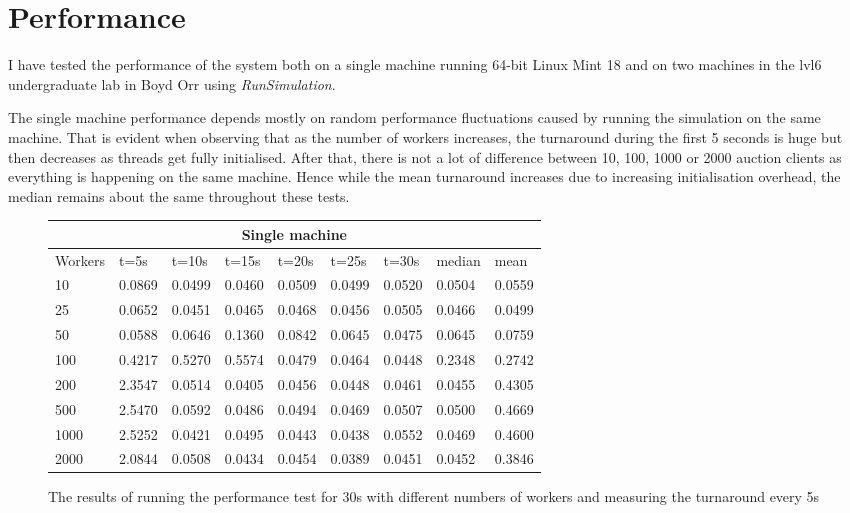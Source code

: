 \documentclass[10pt]{article}
\begin{document}
\section{Performance}
I have tested the performance of the system both on a single machine running 64-bit Linux Mint 18 and on two machines in the lvl6 undergraduate lab in Boyd Orr using \textit{RunSimulation}.\\ \par
The single machine performance depends mostly on random performance fluctuations caused by running the simulation on the same machine. That is evident when observing that as the number of workers increases, the turnaround during the first 5 seconds is huge but then decreases as threads get fully initialised. After that, there is not a lot of difference between 10, 100, 1000 or 2000 auction clients as everything is happening on the same machine. Hence while the mean turnaround increases due to increasing initialisation overhead, the median remains about the same throughout these tests.
\begin{figure}[h]
\begin{center}
\begin{tabular}{ |p{1.2cm}||p{1cm}|p{1cm}|p{1cm}|p{1cm}|p{1cm}|p{1cm}||p{1cm}||p{1cm}|  }
 \hline
 \multicolumn{9}{|c|}{Single machine} \\
 \hline
 Workers & t=5s & t=10s & t=15s & t=20s & t=25s & t=30s & median & mean\\
 \hline
10 & 0.0869 & 0.0499 & 0.0460 & 0.0509 & 0.0499 & 0.0520 & 0.0504 & 0.0559\\
25 & 0.0652 & 0.0451 & 0.0465 & 0.0468 & 0.0456 & 0.0505 & 0.0466 & 0.0499\\
50 & 0.0588 & 0.0646 & 0.1360 & 0.0842 & 0.0645 & 0.0475 & 0.0645 & 0.0759\\
100 & 0.4217 & 0.5270 & 0.5574 & 0.0479 & 0.0464 & 0.0448 & 0.2348 & 0.2742\\
200 & 2.3547 & 0.0514 & 0.0405 & 0.0456 & 0.0448 & 0.0461 & 0.0455 & 0.4305\\
500 & 2.5470 & 0.0592 & 0.0486 & 0.0494 & 0.0469 & 0.0507 & 0.0500 & 0.4669\\
1000 & 2.5252 & 0.0421 & 0.0495 & 0.0443 & 0.0438 & 0.0552 & 0.0469 & 0.4600\\
2000 & 2.0844 & 0.0508 & 0.0434 & 0.0454 & 0.0389 & 0.0451 & 0.0452 & 0.3846\\
 \hline
\end{tabular}
\end{center}
\caption{The results of running the performance test for 30s with different numbers of workers and measuring the turnaround every 5s}
\end{figure}
\end{document}
